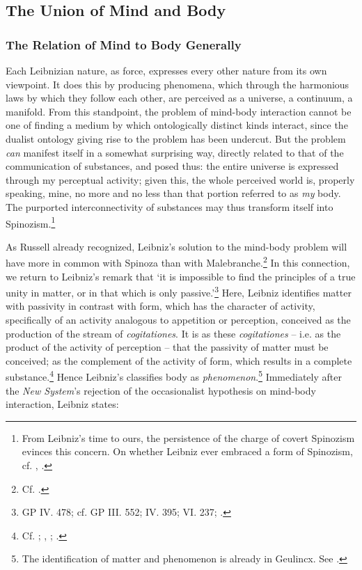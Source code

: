 \documentclass{article}
\begin{document}
\subsection{The Union of Mind and
Body}

\subsubsection{The Relation of Mind to Body
Generally}
Each Leibnizian nature, as force, expresses every other nature from its
own viewpoint. It does this by producing phenomena, which through the
harmonious laws by which they follow each other, are perceived as a
universe, a continuum, a manifold. From this standpoint, the problem of
mind-body interaction cannot be one of finding a medium by which
ontologically distinct kinds interact, since the dualist ontology giving
rise to the problem has been undercut. But the problem \emph{can}
manifest itself in a somewhat surprising way, directly related to that
of the communication of substances, and posed thus: the entire universe
is expressed through my perceptual activity; given this, the whole
perceived world is, properly speaking, mine, no more and no less than
that portion referred to as \emph{my} body. The purported
interconnectivity of substances may thus transform itself into
Spinozism.\footnote{From Leibniz's time to ours, the persistence of the
  charge of covert Spinozism evinces this concern. On whether Leibniz
  ever embraced a form of Spinozism, cf. \autocite{Mercer1999}, \autocite{Kulstad2002}.}

As Russell already recognized, Leibniz's solution to the mind-body
problem will have more in common with Spinoza than with
Malebranche.\footnote{Cf. \autocite[139]{Russell1951}.} In this connection, we
return to Leibniz's remark that `it is impossible to find the principles
of a true unity in matter, or in that which is only passive.'\footnote{GP
  IV. 478; cf. GP III. 552; IV. 395; VI. 237; \autocite[30-31]{Howard2017}.}
Here, Leibniz identifies matter with passivity in contrast with form,
which has the character of activity, specifically of an activity
analogous to appetition or perception, conceived as the production of
the stream of \emph{cogitationes}. It is as these \emph{cogitationes} --
i.e. as the product of the activity of perception -- that the passivity
of matter must be conceived; as the complement of the activity of form,
which results in a complete substance.\footnote{Cf. \autocite{Furth1967};
  \autocite{Rutherford1990}, \autocite{Rutherford1995}; \autocite{Adams1994}.} Hence Leibniz's classifies body as
\emph{phenomenon}.\footnote{The identification of matter and phenomenon
  is already in Geulincx. See \autocite[179]{Cooney1978}.} Immediately after the
\emph{New System}'s rejection of the occasionalist hypothesis on
mind-body interaction, Leibniz states:
\end{document}
